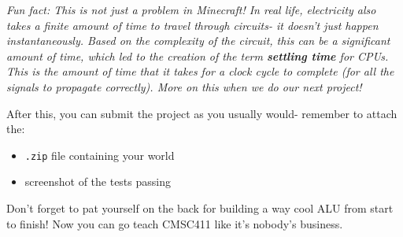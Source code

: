 \documentclass{article}
\begin{document}
\textit{Fun fact: This is not just a problem in Minecraft! In real life, electricity also takes a finite amount of time to travel through circuits- it doesn't just happen instantaneously. Based on the complexity of the circuit, this can be a significant amount of time, which led to the creation of the term \textbf{settling time} for CPUs. This is the amount of time that it takes for a clock cycle to complete (for all the signals to propagate correctly). More on this when we do our next project!}

After this, you can submit the project as you usually would- remember to attach the:

\begin{itemize}
  \item \texttt{.zip} file containing your world
  \item screenshot of the tests passing
\end{itemize}

Don't forget to pat yourself on the back for building a way cool ALU from start to finish!
Now you can go teach CMSC411 like it's nobody's business.
\end{document}
